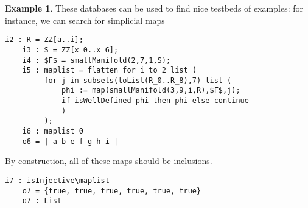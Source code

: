 \documentclass[12pt,leqno]{amsart}
\theoremstyle{definition}
\newtheorem{example}[lemma]{Example}
\begin{document}
\begin{example}
  \label{E:using manifold database}
  These databases can be used to find nice testbeds of examples: for instance,
  we can search for simplicial maps
  \begin{lstlisting}[basicstyle={\ttfamily \scriptsize}, xleftmargin=-23pt]
    i2 : R = ZZ[a..i];
    i3 : S = ZZ[x_0..x_6];
    i4 : $Γ$ = smallManifold(2,7,1,S);
    i5 : maplist = flatten for i to 2 list (
         for j in subsets(toList(R_0..R_8),7) list (
             phi := map(smallManifold(3,9,i,R),$Γ$,j);
             if isWellDefined phi then phi else continue
             )
         );
    i6 : maplist_0
    o6 = | a b e f g h i |
  \end{lstlisting}
  By construction, all of these maps should be inclusions.
  \begin{lstlisting}[basicstyle={\ttfamily \scriptsize}, xleftmargin=-23pt]
    i7 : isInjective\maplist
    o7 = {true, true, true, true, true, true}
    o7 : List
  \end{lstlisting}
\end{example}
\end{document}
